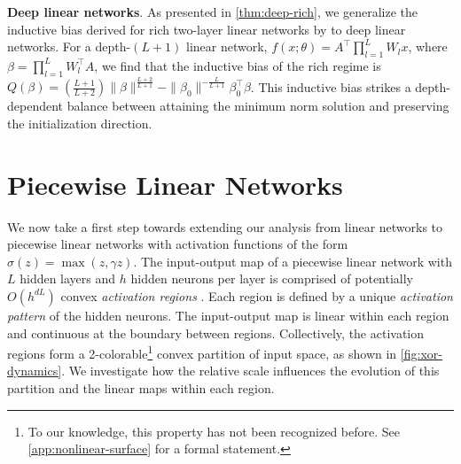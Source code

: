 \documentclass{article}
\theoremstyle{plain}
\theoremstyle{definition}
\theoremstyle{remark}
\begin{document}
\textbf{Deep linear networks}.
%
As presented in \cref{thm:deep-rich}, we generalize the inductive bias derived for rich two-layer linear networks by \citet{azulay2021implicit} to deep linear networks.
%
For a depth-$(L + 1)$ linear network, $f(x;\theta) = A^\intercal \prod_{l=1}^{L} W_l x$, where $\beta = \prod_{l=1}^{L} W_l^\intercal A$, we find that the inductive bias of the rich regime is $Q(\beta) = (\tfrac{L+1}{L+2})\|\beta\|^{\frac{L+2}{L+1}} - \|\beta_0\|^{-\frac{L}{L+1}}\beta_0^\intercal \beta$.
%
This inductive bias strikes a depth-dependent balance between attaining the minimum norm solution and preserving the initialization direction.

%
%




\vspace{-10pt}
\section{Piecewise Linear Networks}
\label{sec:nonlinear}
\vspace{-5pt}

We now take a first step towards extending our analysis from linear networks to piecewise linear networks with activation functions of the form $\sigma(z) = \max(z, \gamma z)$. %
%
%
%
The input-output map of a piecewise linear network with $L$ hidden layers and $h$ hidden neurons per layer is comprised of potentially $O(h^{dL})$ convex \emph{activation regions} \cite{raghu2017expressive}.
%
Each region is defined by a unique \emph{activation pattern} of the hidden neurons.
%
The input-output map is linear within each region and continuous at the boundary between regions. 
%
Collectively, the activation regions form a 2-colorable\footnote{To our knowledge, this property has not been recognized before. See \cref{app:nonlinear-surface} for a formal statement.} convex partition of input space, as shown in \cref{fig:xor-dynamics}.
%
We investigate how the relative scale influences the evolution of this partition and the linear maps within each region.
\end{document}
